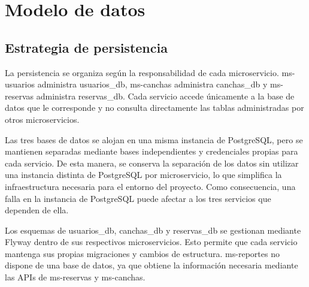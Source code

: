 %

\section{Modelo de datos}
\label{sec:modelo-datos}

\subsection{Estrategia de persistencia}
\label{sec:estrategia-datos}

La persistencia se organiza según la responsabilidad de cada microservicio.
ms-usuarios administra usuarios\_db, ms-canchas administra canchas\_db y
ms-reservas administra reservas\_db. Cada servicio accede únicamente a la base
de datos que le corresponde y no consulta directamente las tablas administradas
por otros microservicios.

Las tres bases de datos se alojan en una misma instancia de PostgreSQL, pero se
mantienen separadas mediante bases independientes y credenciales propias para cada
servicio. De esta manera, se conserva la separación de los datos sin utilizar una
instancia distinta de PostgreSQL por microservicio, lo que simplifica la
infraestructura necesaria para el entorno del proyecto. Como consecuencia, una
falla en la instancia de PostgreSQL puede afectar a los tres servicios que dependen
de ella.

Los esquemas de usuarios\_db, canchas\_db y reservas\_db se gestionan mediante
Flyway dentro de sus respectivos microservicios. Esto permite que cada servicio
mantenga sus propias migraciones y cambios de estructura. ms-reportes no dispone
de una base de datos, ya que obtiene la información necesaria mediante las APIs de
ms-reservas y ms-canchas.

